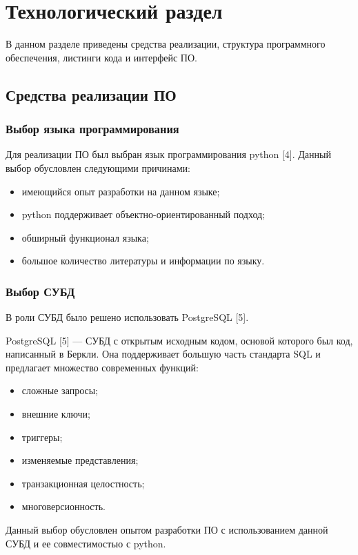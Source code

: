 \chapter{Технологический раздел}

В данном разделе приведены средства реализации, структура программного обеспечения, листинги кода и интерфейс ПО.

\section{Средства реализации ПО}

\subsection{Выбор языка программирования}

Для реализации ПО был выбран язык программирования python [4]. Данный выбор обусловлен следующими причинами:
\begin{itemize}
	\item имеющийся опыт разработки на данном языке;
	\item python поддерживает объектно-ориентированный подход;
	\item обширный функционал языка;
	\item большое количество литературы и информации по языку.
\end{itemize}

\subsection{Выбор СУБД}

В роли СУБД было решено использовать PostgreSQL [5].

PostgreSQL [5] --- СУБД с открытым исходным кодом, основой которого был код, написанный в Беркли. Она поддерживает большую часть стандарта SQL и предлагает множество современных функций:

\begin{itemize}
 \item сложные запросы;
 \item внешние ключи;
 \item триггеры;
 \item изменяемые представления;
 \item транзакционная целостность;
 \item многоверсионность.
\end{itemize}

Данный выбор обусловлен опытом разработки ПО с использованием данной СУБД и ее совместимостью с python.

